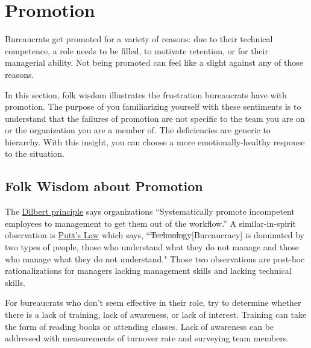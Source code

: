 \section{Promotion\label{sec:promotion}}

Bureaucrats get promoted for a variety of reasons: due to their technical competence, a role needs to be filled, to motivate retention, or for their managerial ability.  Not being promoted can feel like a slight against any of those reasons. 

In this section, folk wisdom illustrates the frustration bureaucrats have with promotion. The purpose of you familiarizing yourself with these sentiments is to understand that the failures of promotion are not specific to the team you are on or the organization you are a member of. The deficiencies are generic to hierarchy. With this insight, you can choose a more emotionally-healthy response to the situation. 

\subsection*{Folk Wisdom about Promotion}

The 
\href{https://en.wikipedia.org/wiki/Dilbert_principle}{Dilbert principle}
says organizations
``Systematically promote incompetent employees to management to get them out of the workflow.''
A similar-in-spirit observation is 
\href{https://en.wikipedia.org/wiki/Putt\%27s_Law_and_the_Successful_Technocrat}{Putt's Law}
which says,
``\sout{Technology}[Bureaucracy] is dominated by two types of people, those who understand what they do not manage and those who manage what they do not understand."
Those two observations are post-hoc rationalizations for managers lacking management skills and lacking technical skills. 

For bureaucrats who don't seem effective in their role, try to determine whether there is a lack of training, lack of awareness, or lack of interest. Training can take the form of reading books or attending classes. Lack of awareness can be addressed with measurements of turnover rate and surveying team members. 




